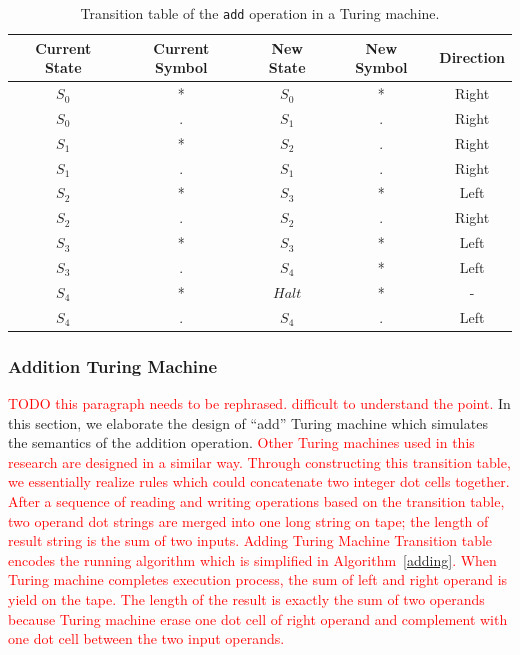 \documentclass[lnicst]{svmultln}
\begin{document}
\begin{table}
\centering
\begin{tabular}{ |c|c|c|c|c|} 
  \hline
  \textbf{Current State} & \textbf{Current Symbol} & \textbf{New State} & \textbf{New Symbol} & \textbf{Direction} \\ 
  \hline
  \(S_0\) & * & \(S_0\) & * & Right\\ 
  \hline
  \(S_0\) & . &\(S_1\)  & . & Right\\
  \hline
  \(S_1\) & * &\(S_2\) & . & Right\\  
  \hline
  \(S_1\) & . & \(S_1\) & . & Right \\
  \hline
  \(S_2\) & * & \(S_3\) & * & Left \\
  \hline
  \(S_2\) & . & \(S_2\) & . & Right \\
  \hline
  \(S_3\) & * & \(S_3\) & * & Left \\
  \hline
  \(S_3\) & . & \(S_4\) & * & Left \\
  \hline
  \(S_4\) & * & \(Halt\) & * & - \\
  \hline
  \(S_4\) & . & \(S_4\) & . & Left\\
  \hline

\end{tabular}
\caption{Transition table of the \texttt{add} operation in a Turing machine.}
\label{table:1}
\end{table}

\subsubsection{Addition Turing Machine}
\textcolor{red}{TODO this paragraph needs to be rephrased. difficult to understand the point.}
In this section, we elaborate the design of ``add'' Turing machine which
simulates the semantics of the addition operation. \textcolor{red}{Other Turing
  machines used in this research are designed in a similar way.}
\textcolor{red}{Through constructing this transition table, we essentially
  realize rules which could concatenate two integer dot cells together. After a
  sequence of reading and writing operations based on the transition table, two
  operand dot strings are merged into one long string on tape; the length of
  result string is the sum of two inputs. Adding Turing Machine Transition table
  encodes the running algorithm which is simplified in Algorithm~\ref{adding}.
  When Turing machine completes execution process, the sum of left and right
  operand is yield on the tape. The length of the result is exactly the sum of
  two operands because Turing machine erase one dot cell of right operand and
  complement with one dot cell between the two input operands.}
\end{document}
